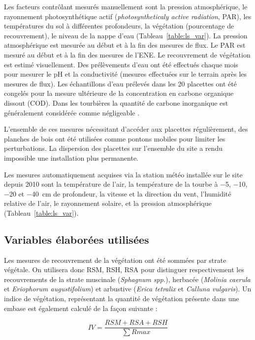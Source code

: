 Les facteurs contrôlant mesurés manuellement sont la pression atmosphérique, le rayonnement photosynthétique actif (\textit{photosyntheticaly active radiation}, PAR), les températures du sol à différentes profondeurs, la végétation (pourcentage de recouvrement), le niveau de la nappe d'eau (Tableau~\ref{table:ls_var}).
La pression atmosphérique est mesurée au début et à la fin des mesures de flux.
Le PAR est mesuré au début et à la fin des mesures de l'ENE.
Le recouvrement de végétation est estimé visuellement.
Des prélèvements d'eau ont été effectués chaque mois pour mesurer le pH et la conductivité (mesures effectuées sur le terrain après les mesures de flux).
Les échantillons d'eau prélevés dans les 20 placettes ont été congelés pour la mesure ultérieure de la concentration en carbone organique dissout (COD).
Dans les tourbières la quantité de carbone inorganique est généralement considérée comme négligeable \citep{worrall2009}.

L'ensemble de ces mesures nécessitant d'accéder aux placettes régulièrement, des planches de bois ont été utilisées comme pontons mobiles pour limiter les perturbations. La dispersion des placettes sur l'ensemble du site a rendu impossible une installation plus permanente.

Les mesures automatiquement acquises via la station météo installée sur le site depuis 2010 sont la température de l'air, la température de la tourbe à \num{-5}, \num{-10}, \num{-20} et \SI{-40}{\centi\metre} de profondeur, la vitesse et la direction du vent, l'humidité relative de l'air, le rayonnement solaire, et la pression atmosphérique (Tableau~\ref{table:ls_var}).

\subsection{Variables élaborées utilisées}

Les mesures de recouvrement de la végétation ont été sommées par strate végétale.
On utilisera donc RSM, RSH, RSA pour distinguer respectivement les recouvrements de la strate muscinale (\textit{Sphagnum spp.}), herbacée (\textit{Molinia caerula} et \textit{Eriophorum augustifolium}) et arbustive (\textit{Erica tetralix} et \textit{Calluna vulgaris}).
Un indice de végétation, représentant la quantité de végétation présente dans une embase est également calculé de la façon suivante : 

\begin{equation}
IV = \frac{RSM + RSA + RSH}{\sum R{max}}
\end{equation}

